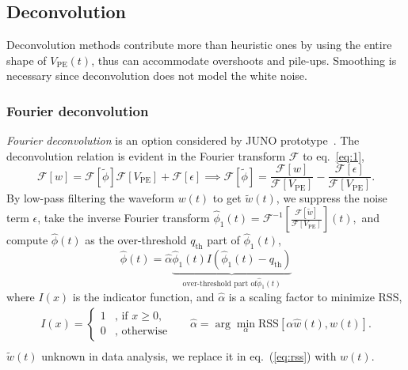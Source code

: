 \subsection{Deconvolution}
\label{sec:deconv}
Deconvolution methods contribute more than heuristic ones by using the entire shape of $V_\mathrm{PE}(t)$, thus can accommodate overshoots and pile-ups.  Smoothing is necessary since deconvolution does not model the white noise.

\subsubsection{Fourier deconvolution}
\label{sec:fourier}
\textit{Fourier deconvolution} is an option considered by JUNO prototype~\cite{zhang_comparison_2019}. The deconvolution relation is evident in the Fourier transform $\mathcal{F}$ to eq.~\eqref{eq:1},
\begin{equation}
  \label{eq:fourier}
  \mathcal{F}[w]  = \mathcal{F}[\tilde{\phi}]\mathcal{F}[V_\mathrm{PE}] + \mathcal{F}[\epsilon]
  \implies \mathcal{F}[\tilde{\phi}]  = \frac{\mathcal{F}[w]}{\mathcal{F}[V_\mathrm{PE}]} - \frac{\mathcal{F}[\epsilon]}{\mathcal{F}[V_\mathrm{PE}]}.
\end{equation}
By low-pass filtering the waveform $w(t)$ to get $\tilde{w}(t)$, we suppress the noise term $\epsilon$, take the inverse Fourier transform $\hat{\phi}_1(t) = \mathcal{F}^{-1}\left[\frac{\mathcal{F}[\tilde{w}]}{\mathcal{F}[V_\mathrm{PE}]}\right](t),$ and compute $\hat{\phi}(t)$ as the over-threshold $q_\mathrm{th}$ part of $\hat{\phi}_1(t)$,
\begin{equation}
  \label{eq:fdconv2}
    \hat{\phi}(t) = \hat{\alpha}\underbrace{\hat{\phi}_1(t) I\left(\hat{\phi}_1(t) - q_\mathrm{th}\right)}_{\text{over-threshold part of} \hat{\phi}_1(t)}  
\end{equation}
where $I(x)$ is the indicator function, and $\hat{\alpha}$ is a scaling factor to minimize $\mathrm{RSS}$,
\begin{equation*}
  \begin{aligned}
  \label{eq:id}
  I(x) = \left\{
    \begin{array}{ll}
      1 & \mbox{, if $x\ge0$}, \\
      0 & \mbox{, otherwise}
    \end{array}
    \right.
    \quad~~~
    \hat{\alpha} = \arg \underset{\alpha}{\min}\mathrm{RSS}\left[\alpha\hat{w}(t),w(t)\right]. \\
  \end{aligned}
\end{equation*}
$\tilde{w}(t)$ unknown in data analysis, we replace it in eq.~(\ref{eq:rss}) with $w(t)$.

